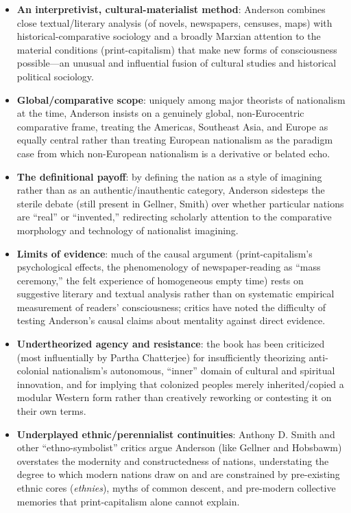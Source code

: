 \documentclass[12pt]{article}
\begin{document}
\begin{itemize}[leftmargin=*, itemsep=4pt]
    \item \textbf{An interpretivist, cultural-materialist method}: Anderson combines close textual/literary analysis (of novels, newspapers, censuses, maps) with historical-comparative sociology and a broadly Marxian attention to the material conditions (print-capitalism) that make new forms of consciousness possible---an unusual and influential fusion of cultural studies and historical political sociology.
    \item \textbf{Global/comparative scope}: uniquely among major theorists of nationalism at the time, Anderson insists on a genuinely global, non-Eurocentric comparative frame, treating the Americas, Southeast Asia, and Europe as equally central rather than treating European nationalism as the paradigm case from which non-European nationalism is a derivative or belated echo.
    \item \textbf{The definitional payoff}: by defining the nation as a style of imagining rather than as an authentic/inauthentic category, Anderson sidesteps the sterile debate (still present in Gellner, Smith) over whether particular nations are ``real'' or ``invented,'' redirecting scholarly attention to the comparative morphology and technology of nationalist imagining.
    \item \textbf{Limits of evidence}: much of the causal argument (print-capitalism's psychological effects, the phenomenology of newspaper-reading as ``mass ceremony,'' the felt experience of homogeneous empty time) rests on suggestive literary and textual analysis rather than on systematic empirical measurement of readers' consciousness; critics have noted the difficulty of testing Anderson's causal claims about mentality against direct evidence.
    \item \textbf{Undertheorized agency and resistance}: the book has been criticized (most influentially by Partha Chatterjee) for insufficiently theorizing anti-colonial nationalism's autonomous, ``inner'' domain of cultural and spiritual innovation, and for implying that colonized peoples merely inherited/copied a modular Western form rather than creatively reworking or contesting it on their own terms.
    \item \textbf{Underplayed ethnic/perennialist continuities}: Anthony D. Smith and other ``ethno-symbolist'' critics argue Anderson (like Gellner and Hobsbawm) overstates the modernity and constructedness of nations, understating the degree to which modern nations draw on and are constrained by pre-existing ethnic cores (\textit{ethnies}), myths of common descent, and pre-modern collective memories that print-capitalism alone cannot explain.

\end{itemize}
\end{document}
